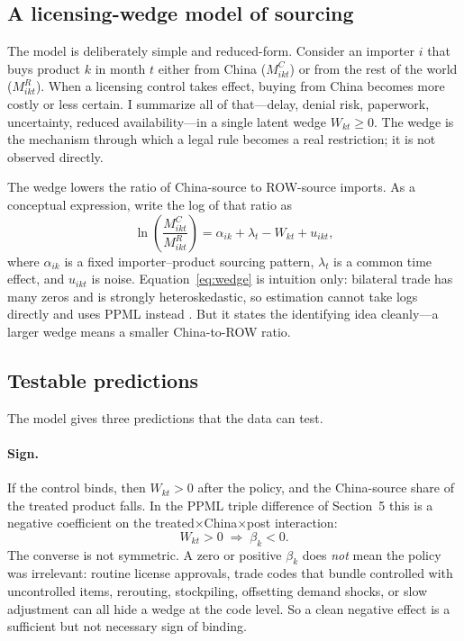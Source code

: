 \documentclass[12pt,a4paper]{article}
\begin{document}
\subsection{A licensing-wedge model of sourcing}\label{sec:model}

The model is deliberately simple and reduced-form. Consider an importer $i$ that
buys product $k$ in month $t$ either from China ($M^{C}_{ikt}$) or from the rest
of the world ($M^{R}_{ikt}$). When a licensing control takes effect, buying from
China becomes more costly or less certain. I summarize all of that---delay, denial
risk, paperwork, uncertainty, reduced availability---in a single latent wedge
$W_{kt}\geq 0$. The wedge is the mechanism through which a legal rule becomes a
real restriction; it is not observed directly.

The wedge lowers the ratio of China-source to ROW-source imports. As a
conceptual expression, write the log of that ratio as
\begin{equation}
\ln\!\left(\frac{M^{C}_{ikt}}{M^{R}_{ikt}}\right)
= \alpha_{ik} + \lambda_{t} - W_{kt} + u_{ikt},
\label{eq:wedge}
\end{equation}
where $\alpha_{ik}$ is a fixed importer--product sourcing pattern, $\lambda_t$ is
a common time effect, and $u_{ikt}$ is noise. Equation~\eqref{eq:wedge} is
intuition only: bilateral trade has many zeros and is strongly heteroskedastic,
so estimation cannot take logs directly and uses PPML instead
\citep{santossilva2006gravity}. But it states the identifying idea cleanly---a
larger wedge means a smaller China-to-ROW ratio.

\subsection{Testable predictions}\label{sec:predictions}

The model gives three predictions that the data can test.

\paragraph{Sign.} If the control binds, then $W_{kt}>0$ after the policy, and the
China-source share of the treated product falls. In the PPML triple difference of
Section~5 this is a negative coefficient on the
treated$\times$China$\times$post interaction:
\begin{equation}
W_{kt}>0 \;\Longrightarrow\; \beta_{k}<0.
\label{eq:sign}
\end{equation}
The converse is not symmetric. A zero or positive $\beta_k$ does \emph{not} mean
the policy was irrelevant: routine license approvals, trade codes that bundle
controlled with uncontrolled items, rerouting, stockpiling, offsetting demand
shocks, or slow adjustment can all hide a wedge at the code level. So a clean
negative effect is a sufficient but not necessary sign of binding.
\end{document}
